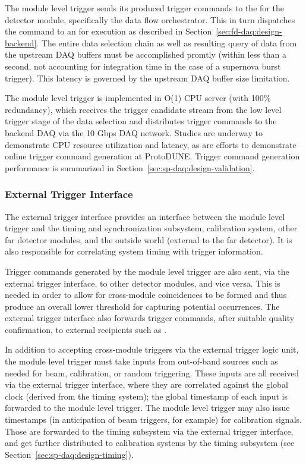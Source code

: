 The module level trigger sends its produced trigger commands to the
 for the detector module, specifically the data flow
orchestrator. This in turn dispatches the command to an  for
execution as described in Section~\ref{sec:fd-daq:design-backend}. The
entire data selection chain as well as resulting query of data from
the upstream DAQ buffers must be 
accomplished promtly (within less than a second, not accounting for
integration time in the case of a supernova burst trigger). This
latency is governed by the upstream DAQ 
buffer size limitation.

The module level trigger is implemented in O(1) CPU server (with 100\%
redundancy), which
receives the trigger candidate stream from the low level trigger stage
of the data selection and distributes trigger commands to the
backend DAQ via the 10 Gbps DAQ network. Studies are
underway to demonstrate CPU resource utilization and latency, as are
efforts to demonstrate online trigger command generation at ProtoDUNE.
Trigger command generation performance is summarized in
Section~\ref{sec:sp-daq:design-validation}.

\subsubsection{External Trigger Interface}

The external trigger interface provides an interface between the
module level trigger and the timing and synchronization subsystem, calibration system,
other far detector modules, and the
outside world (external to the far detector). It is also responsible for correlating system timing with trigger information. 

Trigger commands generated by the module level trigger are also sent,
via the external trigger interface, to other detector modules, and
vice versa. This is needed in order to allow for cross-module
coincidences to be formed and thus produce an overall lower threshold for
capturing potential  occurrences. 
The external trigger interface also forwards  trigger
commands, after suitable quality confirmation, to external recipients
such as .

In addition to accepting cross-module triggers via the external trigger
logic unit, the module level trigger must take inputs from out-of-band sources such as
needed for beam, calibration, or random triggering. These inputs are all
received via the external trigger interface, where they are correlated against the
global clock (derived from the timing system); the global timestamp of
each input is forwarded to the module level trigger. The module level trigger may
also issue timestamps (in anticipation of beam triggers,
for example) for calibration signals. Those are forwarded to the
timing subsystem via the external trigger interface, and get further
distributed to calibration systems by the timing subsystem (see
Section~\ref{sec:sp-daq:design-timing}). 

